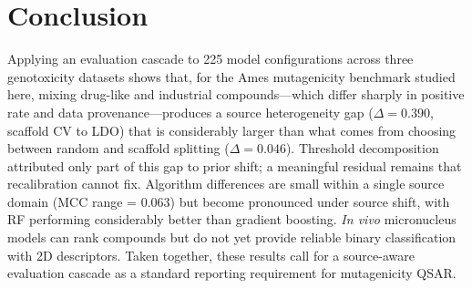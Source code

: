 \documentclass[journal=jacsat,manuscript=article]{achemso}
\begin{document}
\section{Conclusion}

Applying an evaluation cascade to 225 model configurations across three genotoxicity 
datasets shows that, for the Ames mutagenicity benchmark studied here, mixing drug-like and 
industrial compounds---which differ sharply in positive rate and data provenance---produces 
a source heterogeneity gap ($\Delta = 0.390$, scaffold CV to LDO) that is considerably 
larger than what comes from choosing between random and scaffold splitting ($\Delta = 0.046$). 
Threshold decomposition attributed only part of this gap to prior shift; a meaningful 
residual remains that recalibration cannot fix. Algorithm differences are small within a 
single source domain (MCC range = 0.063) but become pronounced under source shift, with RF 
performing considerably better than gradient boosting. \textit{In vivo} micronucleus models can rank 
compounds but do not yet provide reliable binary classification with 2D descriptors. Taken 
together, these results call for a source-aware evaluation cascade as a standard reporting 
requirement for mutagenicity QSAR.







\end{document}
